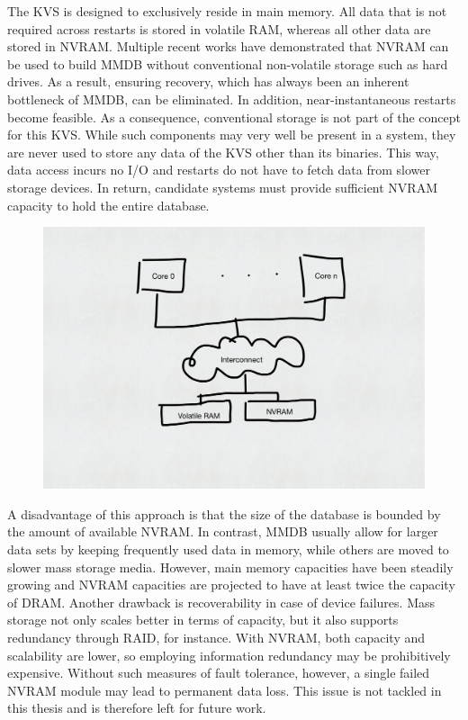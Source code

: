 The KVS is designed to exclusively reside in main memory. All data that is not
required across restarts is stored in volatile RAM, whereas all other data are
stored in NVRAM. Multiple recent works have demonstrated that NVRAM can be used
to build MMDB without conventional non-volatile storage such as hard drives. As
a result, ensuring recovery, which has always been an inherent bottleneck of
MMDB, can be eliminated. In addition, near-instantaneous restarts become
feasible. As a consequence, conventional storage is not part of the concept for
this KVS. While such components may very well be present in a system, they are
never used to store any data of the KVS other than its binaries. This way, data
access incurs no I/O and restarts do not have to fetch data from slower storage
devices. In return, candidate systems must provide sufficient NVRAM capacity to
hold the entire database.


\begin{figure}[!ht]
    \centering
    \includegraphics[scale=0.5]{figures/drafts/concept-sys-mem.pdf}
    \caption{}
    \label{fig:concept-sys-mem}
\end{figure}

A disadvantage of this approach is that the size of the database is bounded by
the amount of available NVRAM. In contrast, MMDB usually allow for larger data
sets by keeping frequently used data in memory, while others are moved to slower
mass storage media. However, main memory capacities have been steadily growing
and NVRAM capacities are projected to have at least twice the capacity of DRAM.
Another drawback is recoverability in case of device failures. Mass storage not
only scales better in terms of capacity, but it also supports redundancy through
RAID, for instance. With NVRAM, both capacity and scalability are lower, so
employing information redundancy may be prohibitively expensive. Without such
measures of fault tolerance, however, a single failed NVRAM module may lead to
permanent data loss. This issue is not tackled in this thesis and is therefore
left for future work.

